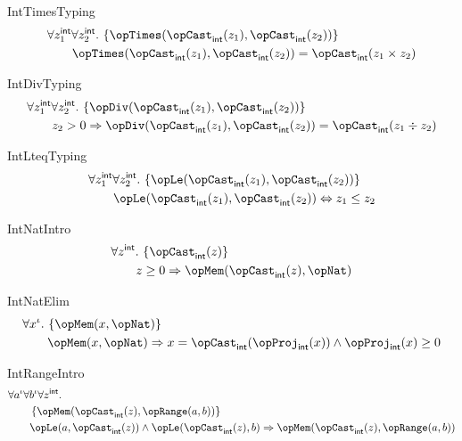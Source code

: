 \documentclass[11pt, a4paper, oneside]{article}
\begin{document}
\begin{axioms}
\item[IntTimesTyping] \[
        \begin{aligned}
            &\forall z_1^\int \forall z_2^\int.\, \st{ \opTimes(\opCast_\int(z_1), \opCast_\int(z_2)) } \\
            &\qquad \opTimes(\opCast_\int(z_1), \opCast_\int(z_2)) = \opCast_\int(z_1 \times z_2)
        \end{aligned}
    \]

\item[IntDivTyping] \[
        \begin{aligned}
            &\forall z_1^\int \forall z_2^\int.\, \st{ \opDiv(\opCast_\int(z_1), \opCast_\int(z_2)) } \\
            &\qquad z_2 > 0 \imp \opDiv(\opCast_\int(z_1), \opCast_\int(z_2)) = \opCast_\int(z_1 \div z_2)
        \end{aligned}
    \]

\item[IntLteqTyping] \[
        \begin{aligned}
            &\forall z_1^\int \forall z_2^\int.\, \st{ \opLe(\opCast_\int(z_1), \opCast_\int(z_2)) } \\
            &\qquad \opLe(\opCast_\int(z_1), \opCast_\int(z_2)) \eqv z_1 \le z_2
        \end{aligned}
    \]

\item[IntNatIntro] \[
        \begin{aligned}
            &\forall z^\int.\, \st{ \opCast_\int(z) } \\
            &\qquad z \ge 0 \imp \opMem(\opCast_\int(z), \opNat)
        \end{aligned}
    \]

\item[IntNatElim] \[
        \begin{aligned}
            &\forall x^\idv.\, \st{ \opMem(x, \opNat) } \\
            &\qquad \opMem(x, \opNat) \imp x = \opCast_\int(\opProj_\int(x)) \wedge \opProj_\int(x) \ge 0
        \end{aligned}
    \]

\item[IntRangeIntro] \[
        \begin{aligned}
            &\forall a^\idv \forall b^\idv \forall z^\int. \\
            &\qquad \st{ \opMem(\opCast_\int(z), \opRange(a, b)) } \\
            &\qquad \opLe(a, \opCast_\int(z)) \wedge \opLe(\opCast_\int(z), b) \imp \opMem(\opCast_\int(z), \opRange(a, b))
        \end{aligned}
    \]


\end{axioms}
\end{document}
